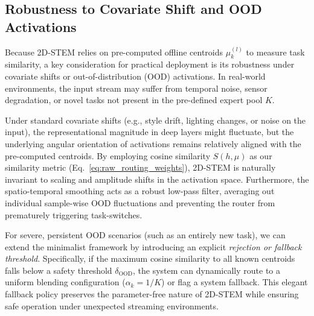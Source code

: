 \subsection{Robustness to Covariate Shift and OOD Activations}
Because 2D-STEM relies on pre-computed offline centroids $\mu_k^{(l)}$ to measure task similarity, a key consideration for practical deployment is its robustness under covariate shifts or out-of-distribution (OOD) activations. In real-world environments, the input stream may suffer from temporal noise, sensor degradation, or novel tasks not present in the pre-defined expert pool $K$.

Under standard covariate shifts (e.g., style drift, lighting changes, or noise on the input), the representational magnitude in deep layers might fluctuate, but the underlying angular orientation of activations remains relatively aligned with the pre-computed centroids. By employing cosine similarity $S(h, \mu)$ as our similarity metric (Eq.~\ref{eq:raw_routing_weights}), 2D-STEM is naturally invariant to scaling and amplitude shifts in the activation space. Furthermore, the spatio-temporal smoothing acts as a robust low-pass filter, averaging out individual sample-wise OOD fluctuations and preventing the router from prematurely triggering task-switches.

For severe, persistent OOD scenarios (such as an entirely new task), we can extend the minimalist framework by introducing an explicit \emph{rejection or fallback threshold}. Specifically, if the maximum cosine similarity to all known centroids falls below a safety threshold $\delta_{\text{OOD}}$, the system can dynamically route to a uniform blending configuration ($\alpha_k = 1/K$) or flag a system fallback. This elegant fallback policy preserves the parameter-free nature of 2D-STEM while ensuring safe operation under unexpected streaming environments.


